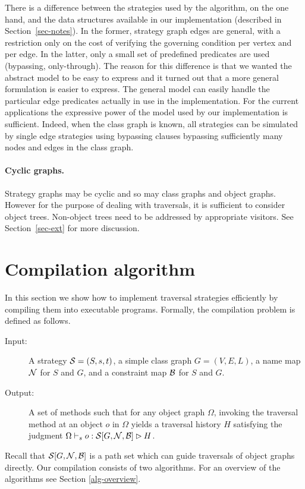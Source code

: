 There is a difference between the strategies used by the algorithm, on
the one hand, and the data structures available in our implementation
(described in Section~\ref{sec-notes}).  In the former, strategy graph
edges are general, with a restriction only on the cost of verifying
the governing condition per vertex and per edge.  In the latter, only
a small set of predefined predicates are used (bypassing,
only-through).  The reason for this difference is that we wanted the
abstract model to be easy to express and it turned out that a more
general formulation is easier to express.  The general model can
easily handle the particular edge predicates actually in use in the
implementation.  For the current applications the expressive power of
the model used by our implementation is sufficient.  Indeed, when the
class graph is known, all strategies can be simulated by single edge
strategies using bypassing clauses bypassing sufficiently many nodes
and edges in the class graph.

\paragraph{Cyclic graphs.}
Strategy graphs may be cyclic and so may class graphs and object
graphs. However for the purpose of dealing with traversals, it is
sufficient to consider object trees. Non-object trees need to be
addressed by appropriate visitors.  See Section~\ref{sec-ext} for more
discussion.

\section{Compilation algorithm}
\label{sec-alg}
In this section we show how to implement traversal strategies 
efficiently by compiling them into  executable programs.
Formally, the compilation problem is defined as follows.

\begin{description}
\item[Input:] A strategy ${\cal S}=(S,s,t)$, a simple class graph
$G=(V,E,L)$, a name map ${\cal N}$ for $S$ and $G$, and a constraint map
${\cal B}$ for $S$ and $G$.
\item[Output:] A set of methods such that for any object graph
$\Omega$, invoking the traversal method at an object $o$ in $\Omega$
yields a traversal history $H$ satisfying the judgment
$\Omega\vdash_{s}o:{\cal S}[G,{\cal N},{\cal B}]\rhd H$.
\end{description}
Recall that ${\cal S}[G,{\cal N},{\cal B}]$ is a path set which can guide traversals
of object graphs directly. Our compilation consists of two
algorithms. For an overview of the algorithms see Section
\ref{alg-overview}.

